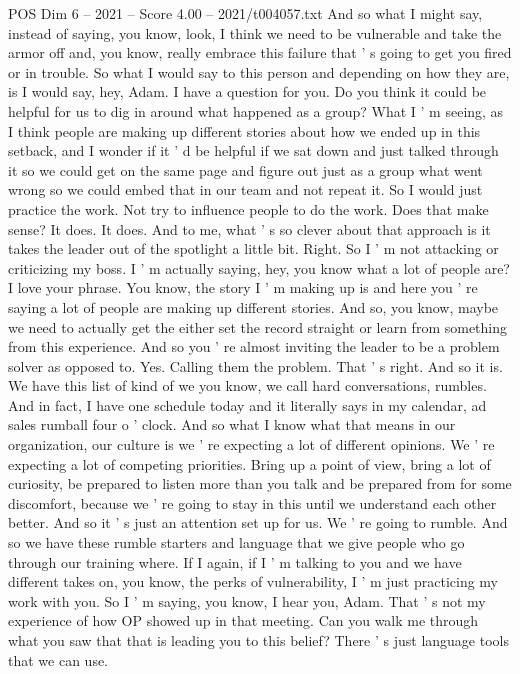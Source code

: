 \begin{textsample}{POS Dim 6 – 2021 – Score 4.00 – 2021/t004057.txt}
And so what I might say, instead of saying, you know, look, I think we need to be vulnerable and take the armor off and, you know, really embrace this failure that ' s going to get you fired or in trouble.
So what I would say to this person and depending on how they are, is I would say, hey, Adam.
I have a question for you.
Do you think it could be helpful for us to dig in around what happened as a group?
What I ' m seeing, as I think people are making up different stories about how we ended up in this setback, and I wonder if it ' d be helpful if we sat down and just talked through it so we could get on the same page and figure out just as a group what went wrong so we could embed that in our team and not repeat it.
So I would just practice the work.
Not try to influence people to do the work.
Does that make sense?
It does.
It does.
And to me, what ' s so clever about that approach is it takes the leader out of the spotlight a little bit.
Right.
So I ' m not attacking or criticizing my boss.
I ' m actually saying, hey, you know what a lot of people are?
I love your phrase.
You know, the story I ' m making up is and here you ' re saying a lot of people are making up different stories.
And so, you know, maybe we need to actually get the either set the record straight or learn from something from this experience.
And so you ' re almost inviting the leader to be a problem solver as opposed to.
Yes.
Calling them the problem.
That ' s right.
And so it is.
We have this list of kind of we you know, we call hard conversations, rumbles.
And in fact, I have one schedule today and it literally says in my calendar, ad sales rumball four o ' clock.
And so what I know what that means in our organization, our culture is we ' re expecting a lot of different opinions.
We ' re expecting a lot of competing priorities.
Bring up a point of view, bring a lot of curiosity, be prepared to listen more than you talk and be prepared from for some discomfort, because we ' re going to stay in this until we understand each other better.
And so it ' s just an attention set up for us.
We ' re going to rumble.
And so we have these rumble starters and language that we give people who go through our training where.
If I again, if I ' m talking to you and we have different takes on, you know, the perks of vulnerability, I ' m just practicing my work with you.
So I ' m saying, you know, I hear you, Adam.
That ' s not my experience of how OP showed up in that meeting.
Can you walk me through what you saw that that is leading you to this belief?
There ' s just language tools that we can use.

\end{textsample}
